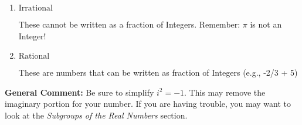 \documentclass{extbook}[14pt]
\begin{document}
\begin{enumerate}
{\begin{enumerate}[label=\Alph*.]
* This is the correct option!
\item \( \text{Irrational} \)

These cannot be written as a fraction of Integers. Remember: $\pi$ is not an Integer!
\item \( \text{Rational} \)

These are numbers that can be written as fraction of Integers (e.g., -2/3 + 5)
\end{enumerate}

\textbf{General Comment:} Be sure to simplify $i^2 = -1$. This may remove the imaginary portion for your number. If you are having trouble, you may want to look at the \textit{Subgroups of the Real Numbers} section.
}
\end{enumerate}
\end{document}
